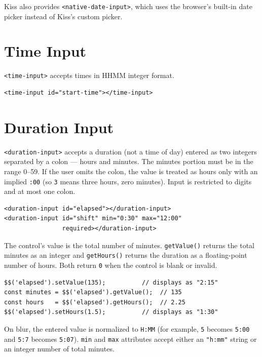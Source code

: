 \noindent
Kiss also provides \texttt{<native-date-input>}, which uses the browser's built-in date picker instead of Kiss's custom picker.

\section{Time Input}
\label{sec:comp-time}

\texttt{<time-input>} accepts times in HHMM integer format.

\begin{lstlisting}[style=html]
<time-input id="start-time"></time-input>
\end{lstlisting}

\section{Duration Input}
\label{sec:comp-duration}

\texttt{<duration-input>} accepts a duration (not a time of day) entered as two integers separated by a colon --- hours and minutes.  The minutes portion must be in the range 0--59.  If the user omits the colon, the value is treated as hours only with an implied \texttt{:00} (so \texttt{3} means three hours, zero minutes).  Input is restricted to digits and at most one colon.

\begin{lstlisting}[style=html]
<duration-input id="elapsed"></duration-input>
<duration-input id="shift" min="0:30" max="12:00"
                required></duration-input>
\end{lstlisting}

The control's value is the total number of minutes.  \texttt{getValue()} returns the total minutes as an integer and \texttt{getHours()} returns the duration as a floating-point number of hours.  Both return \texttt{0} when the control is blank or invalid.

\begin{lstlisting}[style=javascript]
$$('elapsed').setValue(135);          // displays as "2:15"
const minutes = $$('elapsed').getValue();  // 135
const hours   = $$('elapsed').getHours();  // 2.25
$$('elapsed').setHours(1.5);          // displays as "1:30"
\end{lstlisting}

On blur, the entered value is normalized to \texttt{H:MM} (for example, \texttt{5} becomes \texttt{5:00} and \texttt{5:7} becomes \texttt{5:07}).  \texttt{min} and \texttt{max} attributes accept either an \texttt{"h:mm"} string or an integer number of total minutes.

